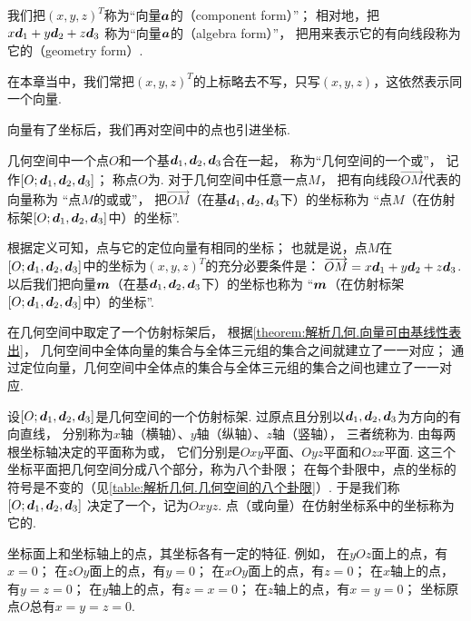 我们把\((x,y,z)^T\)称为“向量\(\boldsymbol{a}\)的（component form）”；
相对地，把\(x \boldsymbol{d}_1 + y \boldsymbol{d}_2 + z \boldsymbol{d}_3\)
称为“向量\(\boldsymbol{a}\)的（algebra form）”，
把用来表示它的有向线段称为它的（geometry form）.

在本章当中，我们常把\((x,y,z)^T\)的上标略去不写，只写\((x,y,z)\)，这依然表示同一个向量.

向量有了坐标后，我们再对空间中的点也引进坐标.

\begin{definition}
几何空间中一个点\(O\)和一个基\(\boldsymbol{d}_1,\boldsymbol{d}_2,\boldsymbol{d}_3\)合在一起，
称为“几何空间的一个或”，
记作\([O;\boldsymbol{d}_1,\boldsymbol{d}_2,\boldsymbol{d}_3]\)；
称点\(O\)为.
对于几何空间中任意一点\(M\)，
把有向线段\(\vec{OM}\)代表的向量称为
“点\(M\)的或或”，
把\(\vec{OM}\)（在基\(\boldsymbol{d}_1,\boldsymbol{d}_2,\boldsymbol{d}_3\)下）的坐标称为
“点\(M\)（在仿射标架\([O;\boldsymbol{d}_1,\boldsymbol{d}_2,\boldsymbol{d}_3]\)中）的坐标”.
\end{definition}

根据定义可知，点与它的定位向量有相同的坐标；
也就是说，点\(M\)在\([O;\boldsymbol{d}_1,\boldsymbol{d}_2,\boldsymbol{d}_3]\)中的坐标为\((x,y,z)^T\)的充分必要条件是：
\(\overrightarrow{OM} = x \boldsymbol{d}_1 + y \boldsymbol{d}_2 + z \boldsymbol{d}_3\).
以后我们把向量\(\boldsymbol{m}\)（在基\(\boldsymbol{d}_1,\boldsymbol{d}_2,\boldsymbol{d}_3\)下）的坐标也称为
“\(\boldsymbol{m}\)（在仿射标架\([O;\boldsymbol{d}_1,\boldsymbol{d}_2,\boldsymbol{d}_3]\)中）的坐标”.

在几何空间中取定了一个仿射标架后，
根据\cref{theorem:解析几何.向量可由基线性表出}，
几何空间中全体向量的集合与全体三元组的集合之间就建立了一一对应；
通过定位向量，几何空间中全体点的集合与全体三元组的集合之间也建立了一一对应.

设\([O;\boldsymbol{d}_1,\boldsymbol{d}_2,\boldsymbol{d}_3]\)是几何空间的一个仿射标架.
过原点且分别以\(\boldsymbol{d}_1,\boldsymbol{d}_2,\boldsymbol{d}_3\)为方向的有向直线，
分别称为\(x\)轴（横轴）、\(y\)轴（纵轴）、\(z\)轴（竖轴），
三者统称为.
由每两根坐标轴决定的平面称为或，
它们分别是\(Oxy\)平面、\(Oyz\)平面和\(Ozx\)平面.
这三个坐标平面把几何空间分成八个部分，称为八个卦限；
在每个卦限中，点的坐标的符号是不变的（见\cref{table:解析几何.几何空间的八个卦限}）.
于是我们称\([O;\boldsymbol{d}_1,\boldsymbol{d}_2,\boldsymbol{d}_3]\)
决定了一个，记为\(Oxyz\).
点（或向量）在仿射坐标系中的坐标称为它的.

坐标面上和坐标轴上的点，其坐标各有一定的特征.
例如，
在\(yOz\)面上的点，有\(x=0\)；
在\(zOy\)面上的点，有\(y=0\)；
在\(xOy\)面上的点，有\(z=0\)；
在\(x\)轴上的点，有\(y=z=0\)；
在\(y\)轴上的点，有\(z=x=0\)；
在\(z\)轴上的点，有\(x=y=0\)；
坐标原点\(O\)总有\(x=y=z=0\).

